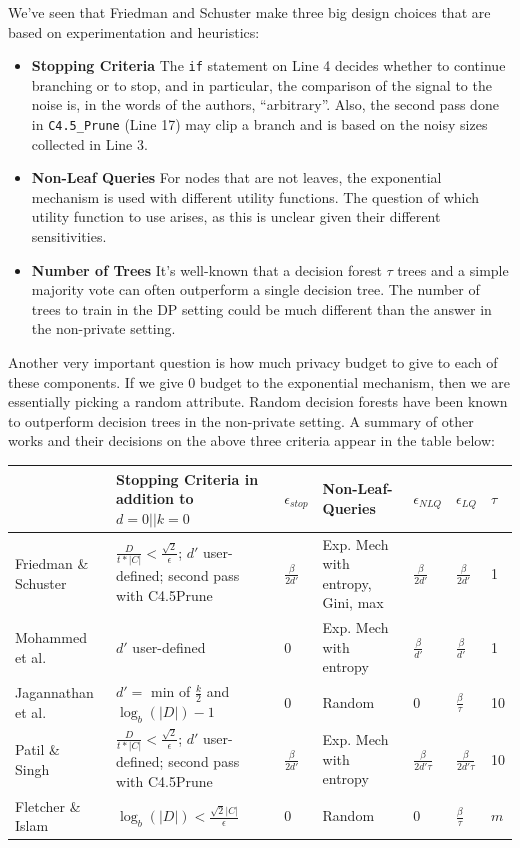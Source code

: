 \documentclass[11pt]{report}
\renewcommand{\t}[1]{\texttt{#1}}
\begin{document}
We've seen that Friedman and Schuster make three big design choices that are based on experimentation and heuristics:
\begin{itemize}
\item \textbf{Stopping Criteria} The \t{if} statement on Line 4 decides whether to continue branching or to stop, and in particular, the comparison of the signal to the noise is, in the words of the authors, ``arbitrary''. Also, the second pass done in \t{C4.5\_Prune} (Line 17) may clip a branch and is based on the noisy sizes collected in Line 3. 
\item \textbf{Non-Leaf Queries} For nodes that are not leaves, the exponential mechanism is used with different utility functions. The question of which utility function to use arises, as this is unclear given their different sensitivities.
\item \textbf{Number of Trees} It's well-known that a decision forest $\tau$ trees and a simple majority vote can often outperform a single decision tree. The number of trees to train in the DP setting could be much different than the answer in the non-private setting.
\end{itemize}
Another very important question is how much privacy budget to give to each of these components. If we give $0$ budget to the exponential mechanism, then we are essentially picking a random attribute. Random decision forests have been known to outperform decision trees in the non-private setting.
A summary of other works and their decisions on the above three criteria appear in the table below:
\begin{center}
\begin{tabular}{|p{2cm}|p{3cm}|l|p{3cm}|l|l|l|}
\hline
\; & Stopping Criteria in addition to $d = 0 || k=0$& $\epsilon_{stop}$ & Non-Leaf-Queries & $\epsilon_{NLQ}$ & $\epsilon_{LQ}$ & $\tau$ \\ \hline
Friedman \& Schuster~\cite{Friedman:2010} & $\frac{D}{t*|C|} < \frac{\sqrt{2}}{\epsilon}$; $d'$ user-defined; second pass with C4.5Prune & $\frac{\beta}{2d'}$ & Exp. Mech with entropy, Gini, max & $\frac{\beta}{2d'}$ & $\frac{\beta}{2d'}$ & 1 \\ \hline
Mohammed et al.~\cite{Mohammed:2015} & $d'$ user-defined & 0 & Exp. Mech with entropy & $\frac{\beta}{d'}$ & $\frac{\beta}{d'}$ & 1 \\ \hline
Jagannathan et al.~\cite{Jagannathan:2009} & $d'=$ min of $\frac{k}{2}$ and $\log_b(|D|)-1$ & 0 & Random & 0 & $\frac{\beta}{\tau}$ & 10 \\ \hline
Patil \& Singh~\cite{Singh:2014} & $\frac{D}{t*|C|} < \frac{\sqrt{2}}{\epsilon}$; $d'$ user-defined; second pass with C4.5Prune & $\frac{\beta}{2d'}$ & Exp. Mech with entropy & $\frac{\beta}{2d'\tau}$ & $\frac{\beta}{2d'\tau}$ & 10 \\ \hline
Fletcher \& Islam~\cite{Fletcher:2015} & $\log_b(|D|) < \frac{\sqrt{2}|C|}{\epsilon}$ & 0 & Random & 0 & $\frac{\beta}{\tau}$ & $m$ \\ \hline
\end{tabular}
\end{center}
\end{document}
